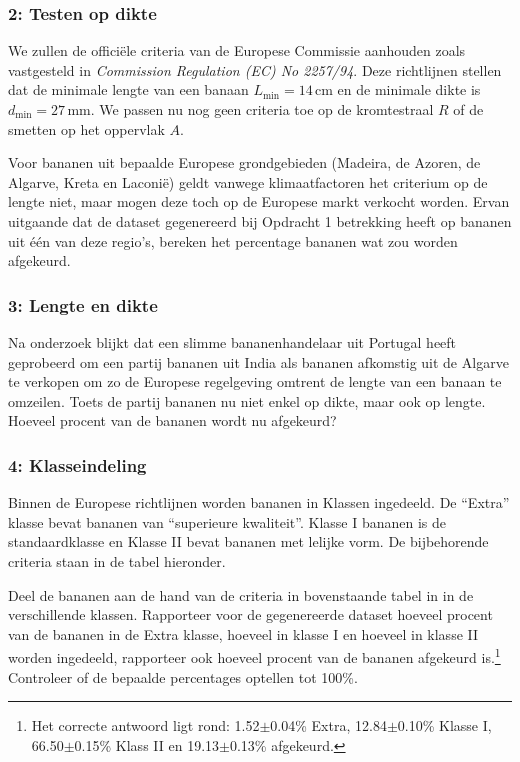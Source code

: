 \documentclass[a4paper,11pt, fleqn]{article}
\begin{document}
\subsubsection*{2: Testen op dikte}
We zullen de offici\"ele criteria van de Europese Commissie aanhouden zoals vastgesteld in \emph{Commission Regulation (EC) No 2257/94}. Deze richtlijnen stellen dat de minimale lengte van een banaan $L_\textrm{min} = 14\,\textrm{cm}$ en de minimale dikte is $d_\textrm{min} = 27\,\textrm{mm}$. We passen nu nog geen criteria toe op de kromtestraal $R$ of de smetten op het oppervlak $A$.

Voor bananen uit bepaalde Europese grondgebieden (Madeira, de Azoren, de Algarve, Kreta en Laconi\"e) geldt vanwege klimaatfactoren het criterium op de lengte niet, maar mogen deze toch op de Europese markt verkocht worden. Ervan uitgaande dat de dataset gegenereerd bij Opdracht 1 betrekking heeft op bananen uit \'e\'en van deze regio's, bereken het percentage bananen wat zou worden afgekeurd.

\subsubsection*{3: Lengte en dikte}
Na onderzoek blijkt dat een slimme bananenhandelaar uit Portugal heeft geprobeerd om een partij bananen uit India als bananen afkomstig uit de Algarve te verkopen om zo de Europese regelgeving omtrent de lengte van een banaan te omzeilen. Toets de partij bananen nu niet enkel op dikte, maar ook op lengte. Hoeveel procent van de bananen wordt nu afgekeurd?

\subsubsection*{4: Klasseindeling}
Binnen de Europese richtlijnen worden bananen in Klassen ingedeeld. De ``Extra'' klasse bevat bananen van ``superieure kwaliteit''. Klasse I bananen is de standaardklasse en Klasse II bevat bananen met lelijke vorm. De bijbehorende criteria staan in de tabel hieronder.

Deel de bananen aan de hand van de criteria in bovenstaande tabel in in de verschillende klassen. Rapporteer voor de gegenereerde dataset hoeveel procent van de bananen in de Extra klasse, hoeveel in klasse I en hoeveel in klasse II worden ingedeeld, rapporteer ook hoeveel procent van de bananen afgekeurd is.\footnote{Het correcte antwoord ligt rond: 1.52$\pm$0.04\% Extra, 12.84$\pm$0.10\% Klasse I, 66.50$\pm$0.15\% Klass II en 19.13$\pm$0.13\% afgekeurd.} Controleer of de bepaalde percentages optellen tot 100\%.
\end{document}
